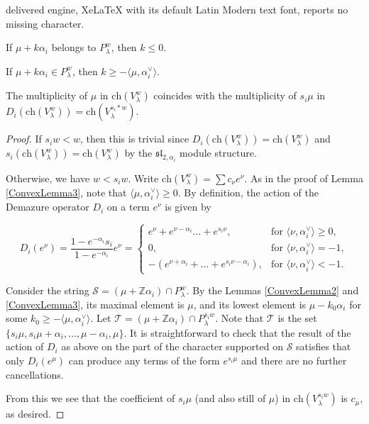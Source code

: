 \documentclass[10pt,a4paper]{amsart}
\newcommand{\Z}{\mathbb{Z}}
\begin{document}
delivered engine, XeLaTeX with its default Latin Modern text font, reports no missing character.
\begin{lemma} \label{ConvexLemma2}
If $\mu+ k\alpha_i$ belongs to $P_\lambda^w$, then $k\le0$. 
\end{lemma}

\begin{lemma} \label{ConvexLemma3}
If $\mu+k\alpha_i \in P^w_\lambda$, then $k \ge - \langle \mu, \alpha_i^\vee \rangle$. 
\end{lemma}

\begin{proposition} \label{MultProp}
The multiplicity of $\mu$ in $\mathrm{ch}(V_\lambda^w)$ coincides with the multiplicity of $s_i\mu$ in $D_{i}\left(\mathrm{ch}(V_\lambda^w)\right)=\mathrm{ch}(V_\lambda^{s_i \ast w})$. 
\end{proposition}

\begin{proof}
If $s_i w < w$, then this is trivial since $D_{i}\left(\mathrm{ch}(V_\lambda^w)\right)=\mathrm{ch}(V_\lambda^w)$ and $s_i\left(\mathrm{ch}(V_\lambda^w)\right)=\mathrm{ch}(V_\lambda^w)$ by the $\mathfrak{sl}_{2, \alpha_i}$ module structure. 

Otherwise, we have $w < s_i w$. Write $\mathrm{ch}(V_\lambda^w) = \sum c_\nu e^\nu$. As in the proof of Lemma \ref{ConvexLemma3}, note that $\langle \mu, \alpha_i^\vee \rangle \geq 0$. By definition, the action of the Demazure operator $D_i$ on a term $e^\nu$ is given by 

  \[
	D_i(e^{\nu}) = \frac{1-e^{-\alpha_i}s_i}{1-e^{-\alpha_i}}e^\nu=  \begin{cases}
	e^{\nu}+e^{\nu-\alpha_i} \dots + e^{s_i \nu}, & \text{for } \langle \nu, \alpha_i^{\vee} \rangle \geq 0, \\
	0, & \text{for } \langle \nu, \alpha_i^{\vee} \rangle =-1,\\
	-(e^{\nu+ \alpha_i}+ \dots + e^{s_i \nu-\alpha_i}), & \text{for } \langle \nu, \alpha_i^{\vee} \rangle <-1.
	\end{cases} 
	\]


Consider the string $\mathcal{S} = (\mu + \Z \alpha_i) \cap P_\lambda^w$. By the Lemmas \ref{ConvexLemma2} and \ref{ConvexLemma3}, its maximal element is $\mu$, and its lowest element is $\mu - k_0 \alpha_i$ for some $k_0 \ge -\langle \mu, \alpha_i^\vee\rangle$. Let $\mathcal{T} = (\mu + \Z \alpha_i) \cap P_\lambda^{s_iw}$. Note that $\mathcal{T}$ is the set $\{s_i\mu, s_i\mu + \alpha_i, \hdots, \mu - \alpha_i, \mu\}$. It is straightforward to check that the result of the action of $D_{i}$ as above on the part of the character supported on $\mathcal{S}$ satisfies that only $D_i(e^\mu)$ can produce any terms of the form $e^{s_i \mu}$ and there are no further cancellations. 


From this we see that the coefficient of $s_i\mu$ (and also still of $\mu$) in $\mathrm{ch}(V_\lambda^{s_iw})$ is $c_\mu$, as desired. 
\end{proof}
\end{document}

